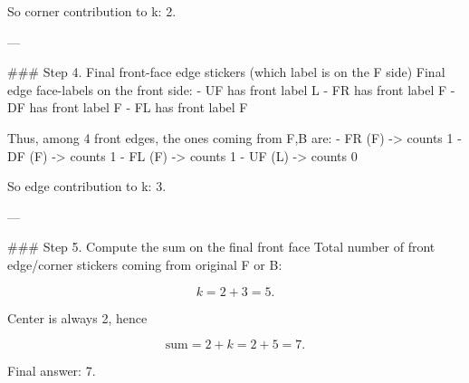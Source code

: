So corner contribution to k: 2.

---

### Step 4. Final front-face edge stickers (which label is on the F side)
Final edge face-labels on the front side:
- UF has front label L
- FR has front label F
- DF has front label F
- FL has front label F

Thus, among 4 front edges, the ones coming from {F,B} are:
- FR (F) -> counts 1
- DF (F) -> counts 1
- FL (F) -> counts 1
- UF (L) -> counts 0

So edge contribution to k: 3.

---

### Step 5. Compute the sum on the final front face
Total number of front edge/corner stickers coming from original F or B:

$$
k=2+3=5.
$$

Center is always 2, hence

$$
\text{sum}=2+k=2+5=7.
$$

Final answer: 7.
